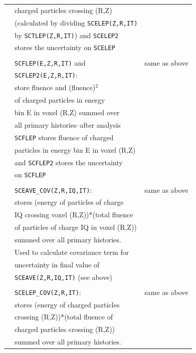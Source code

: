 \documentclass[12pt,twoside]{article}  %
\begin{document}
\begin{longtable}{lll}
         & charged particles crossing (R,Z) &\\
         & (calculated by dividing {\tt SCELEP(Z,R,IT)}&\\
         & by {\tt SCTLEP(Z,R,IT)}) and {\tt SCELEP2}&\\
         & stores the uncertainty on {\tt SCELEP}&\\
         &&\\
         & {\tt SCFLEP(E,Z,R,IT)} and & same as above\\
         & {\tt SCFLEP2(E,Z,R,IT)}: & \\
         & store fluence and (fluence)$^2$ &\\
         & of charged particles in  energy &\\
         & bin E in voxel (R,Z) summed over &\\
         & all primary histories--after analysis &\\ 
         & {\tt SCFLEP} stores fluence of charged&\\
         & particles in energy bin E in voxel (R,Z) &\\
         & and {\tt SCFLEP2} stores the uncertainty &\\
         & on {\tt SCFLEP}&\\
         &&\\
         & {\tt SCEAVE\_COV(Z,R,IQ,IT)}: & same as above\\
         & stores (energy of particles of charge &\\
         & IQ crossing voxel (R,Z))*(total fluence&\\
         & of particles of charge IQ in voxel (R,Z))&\\
         & summed over all primary histories.&\\
         & Used to calculate covariance term for &\\
         & uncertainty in final value of &\\
         & {\tt SCEAVE(Z,R,IQ,IT)} (see above)&\\
         &&\\
         & {\tt SCELEP\_COV(Z,R,IT)}: & same as above\\ 
         & stores (energy of charged particles &\\
         & crossing (R,Z))*(total fluence of &\\
         & charged particles crossing (R,Z)) &\\
         & summed over all primary histories.&\\

\end{longtable}
\end{document}
